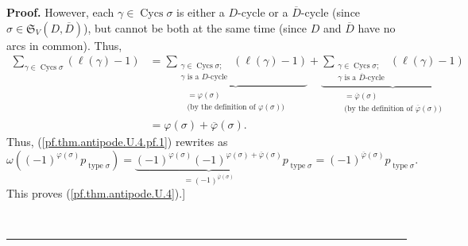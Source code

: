 \documentclass[numbers=enddot,12pt,final,onecolumn,notitlepage]{scrartcl}%
\numberwithin{exer}{section}
\theoremstyle{definition}
\newenvironment{proof}[1][Proof]{\noindent\textbf{#1.} }{\ \rule{0.5em}{0.5em}}
\let\sumnonlimits\sum
\renewcommand{\sum}{\sumnonlimits\limits}
\begin{document}
\begin{proof}
However, each $\gamma\in\operatorname*{Cycs}\sigma$ is either a $D$-cycle or a
$\overline{D}$-cycle (since $\sigma\in\mathfrak{S}_{V}\left(  D,\overline
{D}\right)  $), but cannot be both at the same time (since $D$ and
$\overline{D}$ have no arcs in common). Thus,%
\begin{align*}
\sum_{\gamma\in\operatorname*{Cycs}\sigma}\left(  \ell\left(  \gamma\right)
-1\right)   &  =\underbrace{\sum_{\substack{\gamma\in\operatorname*{Cycs}%
\sigma;\\\gamma\text{ is a }D\text{-cycle}}}\left(  \ell\left(  \gamma\right)
-1\right)  }_{\substack{=\varphi\left(  \sigma\right)  \\\text{(by the
definition of }\varphi\left(  \sigma\right)  \text{)}}}+\underbrace{\sum
_{\substack{\gamma\in\operatorname*{Cycs}\sigma;\\\gamma\text{ is a }%
\overline{D}\text{-cycle}}}\left(  \ell\left(  \gamma\right)  -1\right)
}_{\substack{=\overline{\varphi}\left(  \sigma\right)  \\\text{(by the
definition of }\overline{\varphi}\left(  \sigma\right)  \text{)}}}\\
&  =\varphi\left(  \sigma\right)  +\overline{\varphi}\left(  \sigma\right)  .
\end{align*}
Thus, (\ref{pf.thm.antipode.U.4.pf.1}) rewrites as%
\[
\omega\left(  \left(  -1\right)  ^{\varphi\left(  \sigma\right)
}p_{\operatorname*{type}\sigma}\right)  =\underbrace{\left(  -1\right)
^{\varphi\left(  \sigma\right)  }\left(  -1\right)  ^{\varphi\left(
\sigma\right)  +\overline{\varphi}\left(  \sigma\right)  }}_{=\left(
-1\right)  ^{\overline{\varphi}\left(  \sigma\right)  }}%
p_{\operatorname*{type}\sigma}=\left(  -1\right)  ^{\overline{\varphi}\left(
\sigma\right)  }p_{\operatorname*{type}\sigma}.
\]
This proves (\ref{pf.thm.antipode.U.4}).] \medskip


\end{proof}
\end{document}
